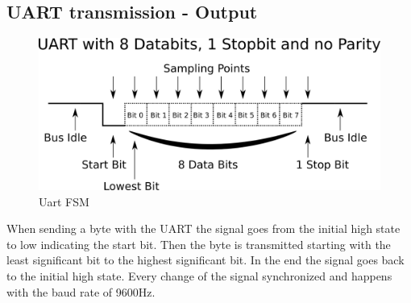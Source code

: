 \documentclass[12pt,a4 paper] {report}
\begin{document}
\subsection*{UART transmission - Output}
\begin{figure}[h]
	\centering	
	\includegraphics[scale=0.5]{../png/rs232image.png}
	\caption{Uart FSM}
\end{figure}
When sending a byte with the UART the signal goes from the initial high state to low indicating the start bit. Then the byte is transmitted starting 
with the least significant bit to the highest significant bit. In the end the signal goes back to the initial high state. Every change of the signal 
synchronized and happens with the baud rate of 9600Hz.

\newpage
\end{document}
